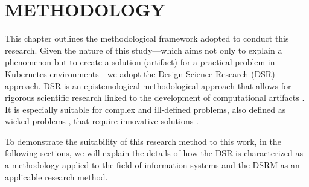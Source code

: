 \chapter{METHODOLOGY}
\label{chap:methodology}

This chapter outlines the methodological framework adopted to conduct this research. Given the nature of this study---which aims not only to explain a phenomenon but to create a solution (artifact) for a practical problem in Kubernetes environments---we adopt the Design Science Research (DSR) approach. DSR is an epistemological-methodological approach that allows for rigorous scientific research linked to the development of computational artifacts \cite{pimentel_2020}. It is especially suitable for complex and ill-defined problems, also defined as wicked problems \cite{marshall_2008}, that require innovative solutions \cite{hevner_2004}.

To demonstrate the suitability of this research method to this work, in the following sections, we will explain the details of how the DSR is characterized as a methodology applied to the field of information systems and the DSRM as an applicable research method.







